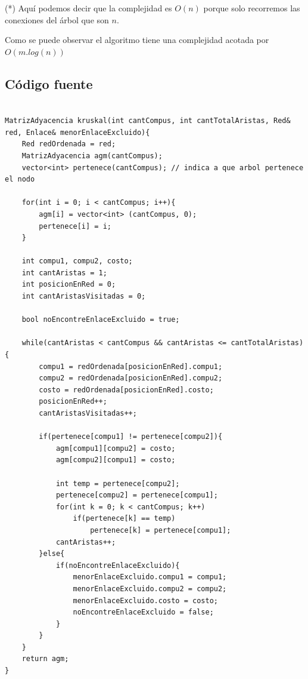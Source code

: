 (*) Aquí podemos decir que la complejidad es $O(n)$ porque solo recorremos las conexiones del árbol que son $n$.

Como se puede observar el algoritmo tiene una complejidad acotada por $O(m.log(n))$


\newpage


\subsection{C\'odigo fuente}

\begin{lstlisting}

MatrizAdyacencia kruskal(int cantCompus, int cantTotalAristas, Red& red, Enlace& menorEnlaceExcluido){
    Red redOrdenada = red;
    MatrizAdyacencia agm(cantCompus);
    vector<int> pertenece(cantCompus); // indica a que arbol pertenece el nodo
 
    for(int i = 0; i < cantCompus; i++){
        agm[i] = vector<int> (cantCompus, 0);
        pertenece[i] = i;
    }
 
    int compu1, compu2, costo;
    int cantAristas = 1;
    int posicionEnRed = 0;
    int cantAristasVisitadas = 0;

    bool noEncontreEnlaceExcluido = true;

    while(cantAristas < cantCompus && cantAristas <= cantTotalAristas){
        compu1 = redOrdenada[posicionEnRed].compu1;
        compu2 = redOrdenada[posicionEnRed].compu2;
        costo = redOrdenada[posicionEnRed].costo;
        posicionEnRed++;
        cantAristasVisitadas++;

        if(pertenece[compu1] != pertenece[compu2]){
            agm[compu1][compu2] = costo;
            agm[compu2][compu1] = costo;
 
        	int temp = pertenece[compu2];
        	pertenece[compu2] = pertenece[compu1];
        	for(int k = 0; k < cantCompus; k++)
        		if(pertenece[k] == temp)
        			pertenece[k] = pertenece[compu1]; 
            cantAristas++;
        }else{
            if(noEncontreEnlaceExcluido){
                menorEnlaceExcluido.compu1 = compu1;
                menorEnlaceExcluido.compu2 = compu2;
                menorEnlaceExcluido.costo = costo;
                noEncontreEnlaceExcluido = false;
            }
        }
    }
    return agm;
}





\end{lstlisting}



